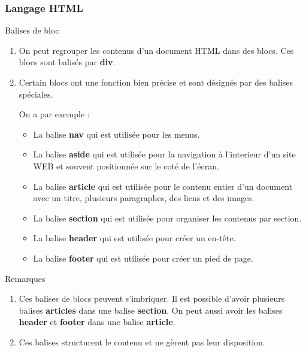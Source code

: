 \documentclass[8pt]{beamer}
\newcounter{num}
\begin{document}
\begin{frame}
\frametitle{Langage HTML}

\begin{block}{Balises de bloc}
\begin{enumerate}
\item On peut regrouper les contenus d'un document HTML dans des blocs. Ces blocs sont balisés par \textbf{div}.
\item Certain blocs ont une fonction bien précise et sont désignés par des balises spéciales.

On a par exemple :

\begin{itemize}
\item La balise \textbf{nav} qui est utilisée pour les menus.
\item La balise \textbf{aside} qui est utilisée pour la navigation à l'interieur d'un site WEB et souvent positionnée sur le coté de l'écran.
\item La balise \textbf{article} qui est utilisée pour le contenu entier d'un document avec un titre, plusieurs paragraphes, des liens et des images.
\item La balise \textbf{section} qui est utilisée pour organiser les contenus par section.
\item La balise \textbf{header} qui est utilisée pour créer un en-tête.
\item La balise \textbf{footer} qui est utilisée pour créer un pied de page.
\end{itemize}
\end{enumerate}

\end{block}

\begin{alertblock}{Remarques}
\begin{enumerate}
\item Ces balises de blocs peuvent s'imbriquer. Il est possible d'avoir plusieurs balises \textbf{articles} dans une balise \textbf{section}. On peut aussi avoir les balises \textbf{header} et \textbf{footer} dans une balise \textbf{article}.
\item Ces balises structurent le contenu et ne gèrent pas leur disposition.
\end{enumerate}

\end{alertblock}

\end{frame}
\end{document}
